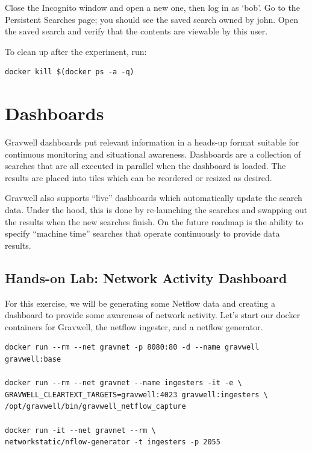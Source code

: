 Close the Incognito window and open a new one, then log in as `bob'. Go
to the Persistent Searches page; you should see the saved search owned
by john. Open the saved search and verify that the contents are viewable by this
user.

To clean up after the experiment, run:

\begin{Verbatim}[breaklines=true]
docker kill $(docker ps -a -q)
\end{Verbatim}



\section{Dashboards}
\label{sec:dashboards}

Gravwell dashboards put relevant information in a
heads-up format suitable for continuous monitoring and situational
awareness. Dashboards are a collection of searches that are all executed in
parallel when the dashboard is loaded. The results are placed into tiles
which can be reordered or resized as desired.

Gravwell also supports ``live'' dashboards which automatically update
the search data. Under the hood, this is done by re-launching the
searches and swapping out the results when the new searches finish. On
the future roadmap is the ability to specify ``machine time'' searches
that operate continuously to provide data results.

\subsection{Hands-on Lab: Network Activity Dashboard}
\label{lab:dashboard}

For this exercise, we will be generating some Netflow data and creating
a dashboard to provide some awareness of network activity. Let's start
our docker containers for Gravwell, the netflow ingester, and a netflow
generator.

\begin{Verbatim}[breaklines=true]
docker run --rm --net gravnet -p 8080:80 -d --name gravwell gravwell:base

docker run --rm --net gravnet --name ingesters -it -e \
GRAVWELL_CLEARTEXT_TARGETS=gravwell:4023 gravwell:ingesters \
/opt/gravwell/bin/gravwell_netflow_capture

docker run -it --net gravnet --rm \
networkstatic/nflow-generator -t ingesters -p 2055
\end{Verbatim}

